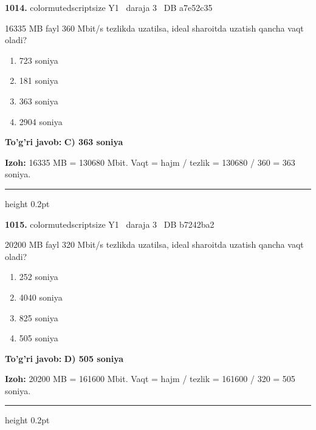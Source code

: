 \documentclass[10pt,a4paper,oneside]{article}
\begin{document}
\noindent\textbf{\color{ink}1014.}  {color{muted}scriptsize Y1 \textbullet\ daraja 3 \textbullet\ DB a7e52c35}
\par
16335 MB fayl 360 Mbit/s tezlikda uzatilsa, ideal sharoitda uzatish qancha vaqt oladi?
\begin{enumerate}[label=\Alph*),leftmargin=9mm]
\item 723 soniya
\item 181 soniya
\item 363 soniya
\item 2904 soniya
\end{enumerate}
\begin{tcolorbox}[enhanced,breakable,colback=teal!4,colframe=teal!50!black,boxrule=0.5pt,arc=1.1mm,left=3mm,right=3mm,top=1.7mm,bottom=1.7mm,before skip=2mm,after skip=2mm]
\textbf{\color{teal}To'g'ri javob:} \textbf{C) 363 soniya}
\par\smallskip
\textbf{Izoh:} 16335 MB = 130680 Mbit. Vaqt = hajm / tezlik = 130680 / 360 = 363 soniya.
\end{tcolorbox}
\vspace{2mm}\hrule height 0.2pt \vspace{3mm}

\noindent\textbf{\color{ink}1015.}  {color{muted}scriptsize Y1 \textbullet\ daraja 3 \textbullet\ DB b7242ba2}
\par
20200 MB fayl 320 Mbit/s tezlikda uzatilsa, ideal sharoitda uzatish qancha vaqt oladi?
\begin{enumerate}[label=\Alph*),leftmargin=9mm]
\item 252 soniya
\item 4040 soniya
\item 825 soniya
\item 505 soniya
\end{enumerate}
\begin{tcolorbox}[enhanced,breakable,colback=teal!4,colframe=teal!50!black,boxrule=0.5pt,arc=1.1mm,left=3mm,right=3mm,top=1.7mm,bottom=1.7mm,before skip=2mm,after skip=2mm]
\textbf{\color{teal}To'g'ri javob:} \textbf{D) 505 soniya}
\par\smallskip
\textbf{Izoh:} 20200 MB = 161600 Mbit. Vaqt = hajm / tezlik = 161600 / 320 = 505 soniya.
\end{tcolorbox}
\vspace{2mm}\hrule height 0.2pt \vspace{3mm}
\end{document}
